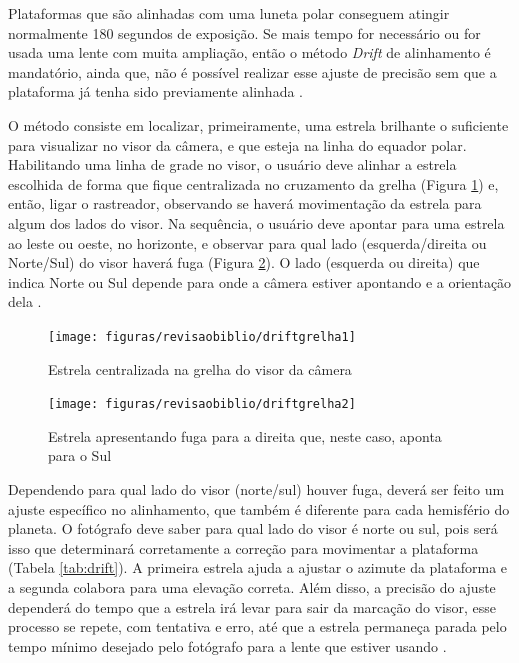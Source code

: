 Plataformas que são alinhadas com uma luneta polar conseguem atingir normalmente 180 segundos de exposição. Se mais tempo for necessário ou for usada uma lente com muita ampliação, então o método \textit{Drift} de alinhamento é mandatório, ainda que, não é possível realizar esse ajuste de precisão sem que a plataforma já tenha sido previamente alinhada \cite{book:bbcsky}. 

O método consiste em localizar, primeiramente, uma estrela brilhante o suficiente para visualizar no visor da câmera, e que esteja na linha do equador polar. Habilitando uma linha de grade no visor, o usuário deve alinhar a estrela escolhida de forma que fique centralizada no cruzamento da grelha (Figura \ref{fig:driftgrelha1}) e, então, ligar o rastreador, observando se haverá movimentação da estrela para algum dos lados do visor. Na sequência, o usuário deve apontar para uma estrela ao leste ou oeste, no horizonte, e observar para qual lado (esquerda/direita ou Norte/Sul) do visor haverá fuga (Figura \ref{fig:driftgrelha2}). O lado (esquerda ou direita) que indica Norte ou Sul depende para onde a câmera estiver apontando e a orientação dela \cite{book:bbcsky}.

\begin{figure}[hbt]
	\centering
	\caption{Estrela centralizada na grelha do visor da câmera}
	\texttt{[image: figuras/revisaobiblio/driftgrelha1]}
	\label{fig:driftgrelha1}
\end{figure}

\begin{figure}[hbt]
	\centering
	\caption{Estrela apresentando fuga para a direita que, neste caso, aponta para o Sul}
	\texttt{[image: figuras/revisaobiblio/driftgrelha2]}
	\label{fig:driftgrelha2}
\end{figure}

Dependendo para qual lado do visor (norte/sul) houver fuga, deverá ser feito um ajuste específico no alinhamento, que também é diferente para cada hemisfério do planeta. O fotógrafo deve saber para qual lado do visor é norte ou sul, pois será isso que determinará corretamente a correção para movimentar a plataforma (Tabela \ref{tab:drift}). A primeira estrela ajuda a ajustar o azimute da plataforma e a segunda colabora para uma elevação correta. Além disso, a precisão do ajuste dependerá do tempo que a estrela irá levar para sair da marcação do visor, esse processo se repete, com tentativa e erro, até que a estrela permaneça parada pelo tempo mínimo desejado pelo fotógrafo para a lente que estiver usando \cite{book:bbcsky}. 

